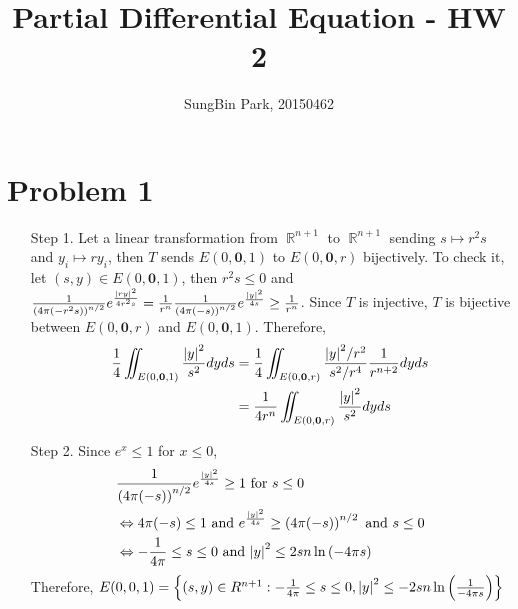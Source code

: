 \documentclass{article}
\DeclareMathOperator{\rr}{\mathbb{R}}
\begin{document}
\title{Partial Differential Equation - HW 2}
\author{SungBin Park, 20150462} 

 \maketitle

\section*{Problem 1}
\begin{enumerate}
	\item [Step 1.] Let a linear transformation from $\rr^{n+1}$ to $\rr^{n+1}$ sending $s\mapsto r^2 s$ and $y_i\mapsto ry_i$, then $T$ sends $E(0, \bm{0}, 1)$ to $E(0, \bm{0}, r )$ bijectively. To check it, let $(s,y)\in E(0, \bm{0}, 1)$, then $r^2s\leq 0$ and $\frac{1}{\left(4\pi(-r^2s)\right)^{n/2}}e^{\frac{\abs{ry}^2}{4r^2s}}=\frac{1}{r^n}\frac{1}{\left(4\pi(-s)\right)^{n/2}}e^{\frac{\abs{y}^2}{4s}}\geq \frac{1}{r^n}$. Since $T$ is injective, $T$ is bijective between $E(0, \bm{0}, r)$ and $E(0, \bm{0}, 1)$. Therefore,
	\begin{equation*}
	\begin{split}
	\frac{1}{4}\iint_{E(0, \bm{0}, 1)}\frac{\abs{y}^2}{s^2}dyds&=\frac{1}{4}\iint_{E(0, \bm{0}, r)}\frac{\abs{y}^2/r^2}{s^2/r^4}\frac{1}{r^{n+2}}dyds \\
	&=\frac{1}{4r^n}\iint_{E(0, \bm{0}, r)}\frac{\abs{y}^2}{s^2}dyds
	\end{split}
	\end{equation*}
    \item [Step 2.] Since $e^x\leq 1$ for $x\leq 0$,
    \begin{equation*}
        \begin{split}
            &\frac{1}{\left(4\pi(-s)\right)^{n/2}}e^{\frac{\abs{y}^2}{4s}}\geq 1 \text{ for }s\leq 0\\
            &\Leftrightarrow 4\pi(-s)\leq 1 \text{ and }e^{\frac{\abs{y}^2}{4s}}\geq \left(4\pi(-s)\right)^{n/2} \text{ and } s\leq 0\\
            &\Leftrightarrow -\frac{1}{4\pi}\leq s\leq 0 \text{ and } \abs{y}^2\leq 2sn\ln{(-4\pi s)}
        \end{split}
    \end{equation*}
    Therefore, $E(0,0,1)=\left\{(s,y)\in R^{n+1}:-\frac{1}{4\pi}\leq s\leq 0 , \abs{y}^2\leq -2sn\ln{\left(\frac{1}{-4\pi s}\right)}\right\}$
    

\end{enumerate}
\end{document}
